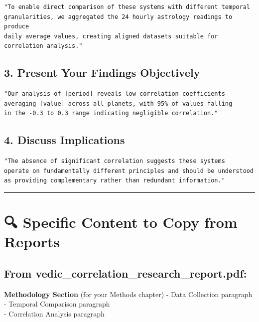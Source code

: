 \documentclass[
  11pt,
  oneside,
  openany]{scrbook}
\begin{document}
\begin{verbatim}
"To enable direct comparison of these systems with different temporal
granularities, we aggregated the 24 hourly astrology readings to produce
daily average values, creating aligned datasets suitable for correlation analysis."
\end{verbatim}

\subsection{3. Present Your Findings
Objectively}\label{present-your-findings-objectively}

\begin{verbatim}
"Our analysis of [period] reveals low correlation coefficients
averaging [value] across all planets, with 95% of values falling
in the -0.3 to 0.3 range indicating negligible correlation."
\end{verbatim}

\subsection{4. Discuss Implications}\label{discuss-implications}

\begin{verbatim}
"The absence of significant correlation suggests these systems
operate on fundamentally different principles and should be understood
as providing complementary rather than redundant information."
\end{verbatim}

\begin{center}\rule{0.5\linewidth}{0.5pt}\end{center}

\section{🔍 Specific Content to Copy from
Reports}\label{specific-content-to-copy-from-reports}

\subsection{From
vedic\_correlation\_research\_report.pdf:}\label{from-vedic_correlation_research_report.pdf}

\textbf{Methodology Section} (for your Methods chapter) - Data
Collection paragraph - Temporal Comparison paragraph\\
- Correlation Analysis paragraph
\end{document}
